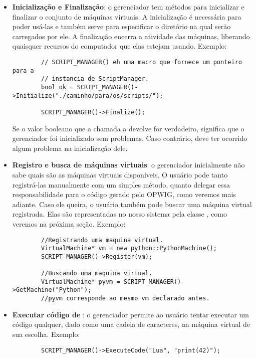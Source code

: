   \begin{itemize}

    \item \textbf{Inicialização e Finalização}: o gerenciador tem métodos para inicializar
      e finalizar o conjunto de máquinas virtuais. A inicialização é necessária para poder
      usá-las e também serve para
      especificar o diretório na qual  serão carregados por ele. A finalização 
      encerra a atividade das máquinas, liberando quaisquer recursos do computador que elas
      estejam usando. Exemplo:
      \vspace{0.01em}
      \begin{lstlisting}
        // SCRIPT_MANAGER() eh uma macro que fornece um ponteiro para a
        // instancia de ScriptManager.
        bool ok = SCRIPT_MANAGER()->Initialize("./caminho/para/os/scripts/");
        
        SCRIPT_MANAGER()->Finalize();
      \end{lstlisting}
      \vspace{0.5em}
      Se o valor booleano que a chamada a  devolve for verdadeiro,
      significa que o gerenciador foi inicializado sem problemas. Caso contrário, deve
      ter ocorrido algum problema na inicialização dele.

    \item \textbf{Registro e busca de máquinas virtuais}: o gerenciador inicialmente não sabe
      quais são as máquinas virtuais disponíveis. O usuário pode tanto registrá-las manualmente com
      um simples método, quanto delegar essa responsabilidade para o código gerado pelo OPWIG, como
      veremos mais adiante. Caso ele queira, o usuário também pode buscar uma máquina
      virtual registrada. Elas são representadas no nosso sistema pela classe \VMac{},
      como veremos na próxima seção. Exemplo:
      \vspace{1em}
      \begin{lstlisting}
        //Registrando uma maquina virtual.
        VirtualMachine* vm = new python::PythonMachine();
        SCRIPT_MANAGER()->Register(vm);
        
        //Buscando uma maquina virtual.
        VirtualMachine* pyvm = SCRIPT_MANAGER()->GetMachine("Python");
        //pyvm corresponde ao mesmo vm declarado antes.
      \end{lstlisting}

    \item \textbf{Executar código de \script{}}: o gerenciador permite ao usuário tentar executar
      um código
      qualquer, dado como uma cadeia de caracteres, na máquina virtual de sua escolha. Exemplo:
      \vspace{1em}
      \begin{lstlisting}
        SCRIPT_MANAGER()->ExecuteCode("Lua", "print(42)");
      \end{lstlisting}


\end{itemize}
